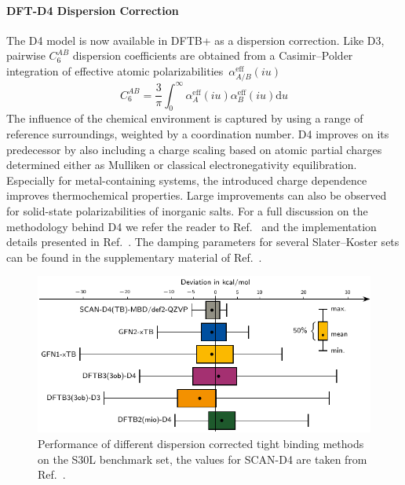 \documentclass[reprint,onecolumn,superscriptaddress]{revtex4-1}
\newcommand{\dftbp}{DFTB+}
\begin{document}
\paragraph{DFT-D4 Dispersion Correction}
The D4 model\cite{caldeweyher2017,caldeweyher2019} is now available in \dftbp{} as
a dispersion correction. Like D3, pairwise $C_6^{AB}$ dispersion coefficients
are obtained from a Casimir--Polder integration of effective atomic
polarizabilities~$\alpha_{A/B}^\text{eff}(iu)$
%
\begin{equation}
  \label{eq:casimir-polder}
  C_6^{AB} = \frac3\pi\int^\infty_0 \alpha_A^\text{eff}(iu)\alpha_B^\text{eff}(iu)
  \mathrm{d}u
\end{equation}
%
The influence of the chemical environment is captured by using a range of
reference surroundings, weighted by a coordination number.  D4 improves on its
predecessor by also including a charge scaling based on atomic partial charges
determined either as Mulliken\cite{caldeweyher2017} or classical
electronegativity equilibration.\cite{caldeweyher2019} Especially for
metal-containing systems, the introduced charge dependence improves
thermochemical properties.\cite{bursch2019} Large improvements can also be
observed for solid-state polarizabilities of inorganic
salts.\cite{caldeweyher2020} For a full discussion on the methodology behind D4
we refer the reader to Ref.~\cite{caldeweyher2019} and the implementation
details presented in Ref.~\cite{caldeweyher2020}. The damping parameters
for several Slater--Koster sets can be found in the supplementary material of
Ref.~\cite{hourahine-JCP-152-124101}.
\begin{figure}[htbp]
  \includegraphics[width=\textwidth]{figures/s30l-boxplot.pdf}
  \caption{\label{fig:d4-s30l} Performance of different dispersion corrected
    tight binding methods on the S30L benchmark set, the values for SCAN-D4 are
    taken from Ref.~\cite{caldeweyher2019}.}
\end{figure}
\end{document}
